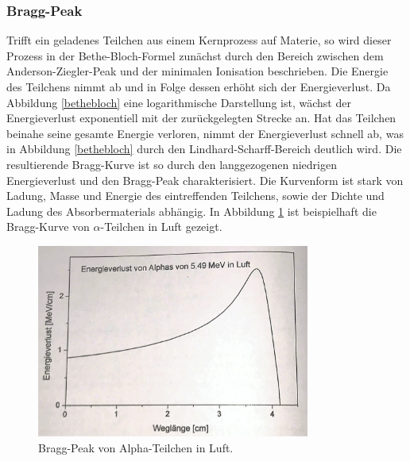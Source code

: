 \subsubsection{Bragg-Peak}


Trifft ein geladenes Teilchen aus einem Kernprozess auf Materie, so wird dieser Prozess in der Bethe-Bloch-Formel zunächst durch den Bereich zwischen dem Anderson-Ziegler-Peak und der minimalen Ionisation beschrieben.
Die Energie des Teilchens nimmt ab und in Folge dessen erhöht sich der Energieverlust.
Da Abbildung \ref{bethebloch} eine logarithmische Darstellung ist, wächst der Energieverlust exponentiell mit der zurückgelegten Strecke an.
Hat das Teilchen beinahe seine gesamte Energie verloren, nimmt der Energieverlust schnell ab, was in Abbildung \ref{bethebloch} durch den Lindhard-Scharff-Bereich deutlich wird.
Die resultierende Bragg-Kurve ist so durch den langgezogenen niedrigen Energieverlust und den Bragg-Peak charakterisiert.
Die Kurvenform ist stark von Ladung, Masse und Energie des eintreffenden Teilchens, sowie der Dichte und Ladung des Absorbermaterials abhängig.
In Abbildung \ref{bragg} ist beispielhaft die Bragg-Kurve von $\alpha$-Teilchen in Luft gezeigt.

\begin{figure}[H]
	\centering
	\includegraphics[width=0.8\textwidth]{img/bragg}
	\caption{Bragg-Peak von Alpha-Teilchen in Luft.\cite{bragg}}
	\label{bragg}
\end{figure}


